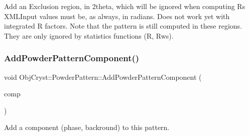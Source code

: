 Add an Exclusion region, in 2theta, which will be ignored when computing R\textquotesingle{}s X\+M\+L\+Input values must be, as always, in radians. Does not work yet with integrated R factors. Note that the pattern is still computed in these regions. They are only ignored by statistics functions (R, Rws). \mbox{\label{class_obj_cryst_1_1_powder_pattern_a0190046adad7091ca0d7818b1ced7bb2}} 
\subsubsection{\texorpdfstring{AddPowderPatternComponent()}{AddPowderPatternComponent()}}
{\footnotesize\ttfamily void Obj\+Cryst\+::\+Powder\+Pattern\+::\+Add\+Powder\+Pattern\+Component (\begin{DoxyParamCaption}\item[{\mbox{\hyperlink{class_obj_cryst_1_1_powder_pattern_component}{Powder\+Pattern\+Component}} \&}]{comp }\end{DoxyParamCaption})}

Add a component (phase, backround) to this pattern.

